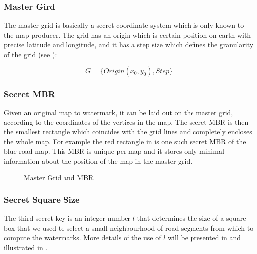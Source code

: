\subsubsection{Master Gird}
The master grid is basically a secret coordinate system which is only known
to the map producer. The grid has an origin which is certain position on earth
with precise latitude and longitude, and it has a step size which defines
the granularity of the grid (see ):

\[G=\{Origin(x_0, y_0), Step\}\]

\subsubsection{Secret MBR}
Given an original map to watermark, it can be laid out on the master grid, according to
the coordinates of the vertices in the map. The secret MBR is then the smallest
rectangle which coincides with the grid lines and completely 
encloses the whole map. For example the red rectangle in  
is one such secret MBR of the blue road map. 
This MBR is unique per map and it stores only
minimal information about the position of the map in the master grid.

\begin{figure}[th]
\centering
{}
\caption{Master Grid and MBR}
\label{fig:grid}
\end{figure}

\subsubsection{Secret Square Size}

The third secret key is an integer number $l$ that determines the size of a square box that we
used to select a small neighbourhood of road segments from which to compute the watermarks.
More details of the use of $l$ will be presented in  and illustrated in
. 


